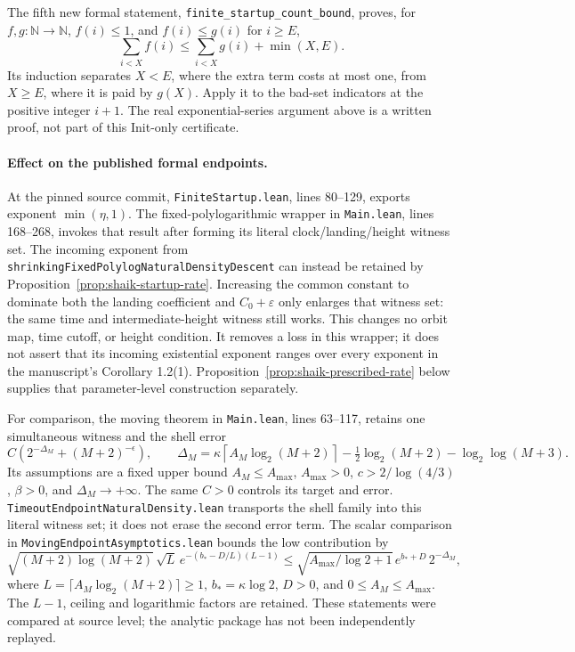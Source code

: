\documentclass[11pt]{article}
\theoremstyle{remark}\newtheorem{remark}[proposition]{Remark}
\begin{document}
The fifth new formal statement, \texttt{finite\_startup\_count\_bound},
proves, for \(f,g:\mathbb N\to\mathbb N\), \(f(i)\le1\), and
\(f(i)\le g(i)\) for \(i\ge E\),
\[
 \sum_{i<X}f(i)\le\sum_{i<X}g(i)+\min(X,E).
\]
Its induction separates \(X<E\), where the extra term costs at most one,
from \(X\ge E\), where it is paid by \(g(X)\).
Apply it to the bad-set indicators at the positive integer \(i+1\).
The real exponential-series argument above is a written proof, not
part of this Init-only certificate.

\paragraph{Effect on the published formal endpoints.}
At the pinned source commit,
\texttt{FiniteStartup.lean}, lines 80--129, exports exponent
\(\min(\eta,1)\).
The fixed-polylogarithmic wrapper in \texttt{Main.lean},
lines 168--268, invokes that result after forming its literal
clock/landing/height witness set.
The incoming exponent from
\texttt{shrinkingFixedPolylogNaturalDensityDescent} can instead be
retained by Proposition~\ref{prop:shaik-startup-rate}.
Increasing the common constant to dominate both the landing coefficient
and \(C_0+\varepsilon\) only enlarges that witness set:
the same time and intermediate-height witness still works.
This changes no orbit map, time cutoff, or height condition.
It removes a loss in this wrapper; it does not assert that its
incoming existential exponent ranges over every exponent in the
manuscript's Corollary 1.2(1). Proposition~\ref{prop:shaik-prescribed-rate}
below supplies that parameter-level construction separately.

For comparison, the moving theorem in \texttt{Main.lean}, lines 63--117,
retains one simultaneous witness and the shell error
\[
 C\left(2^{-\Delta_M}+(M+2)^{-\epsilon}\right),\qquad
 \Delta_M=\kappa\left\lceil A_M\log_2(M+2)\right\rceil
 -\tfrac12\log_2(M+2)-\log_2\log(M+3).
\]
Its assumptions are a fixed upper bound \(A_M\le A_{\max}\),
\(A_{\max}>0\), \(c>2/\log(4/3)\), \(\beta>0\), and
\(\Delta_M\to+\infty\). The same \(C>0\) controls its target and error.
\texttt{TimeoutEndpointNaturalDensity.lean} transports the shell
family into this literal witness set; it does not erase the second
error term. The scalar comparison in
\texttt{MovingEndpointAsymptotics.lean} bounds the low contribution by
\[
 \sqrt{(M+2)\log(M+2)}\,\sqrt L\,
 e^{-(b_*-D/L)(L-1)}
 \le
 \sqrt{A_{\max}/\log2+1}\,e^{b_*+D}\,2^{-\Delta_M},
\]
where \(L=\lceil A_M\log_2(M+2)\rceil\ge1\),
\(b_*=\kappa\log2\), \(D>0\), and \(0\le A_M\le A_{\max}\).
The \(L-1\), ceiling and logarithmic factors are retained.
These statements were compared at source level; the analytic package
has not been independently replayed.
\end{document}
